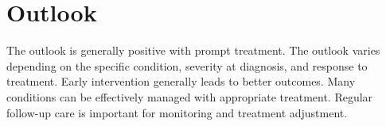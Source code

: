 \section{Outlook}
The outlook is generally positive with prompt treatment. The outlook varies depending on the specific condition, severity at diagnosis, and response to treatment. Early intervention generally leads to better outcomes. Many conditions can be effectively managed with appropriate treatment. Regular follow-up care is important for monitoring and treatment adjustment.
